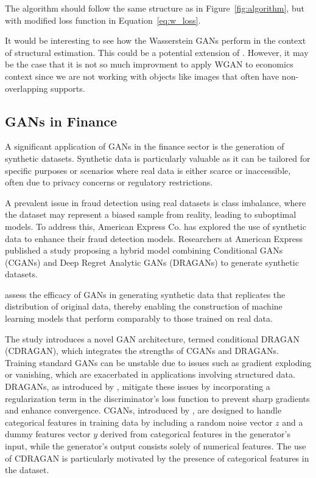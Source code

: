 \documentclass[12pt]{article}
\begin{document}
The algorithm should follow the same structure as in
Figure~\ref{fig:algorithm}, but with modified loss function in
Equation~\eqref{eq:w_loss}.

It would be interesting to see how the Wasserstein GANs perform in the context
of structural estimation. This could be a potential extension of
\citet{kaji2023adversarial}. However, it may be the case that it is not so much
improvment to apply WGAN to economics context since we are not working with
objects like images that often have non-overlapping supports.

\subsection{GANs in Finance}

A significant application of GANs in the finance sector is the generation of
synthetic datasets. Synthetic data is particularly valuable as it can be
tailored for specific purposes or scenarios where real data is either scarce or
inaccessible, often due to privacy concerns or regulatory restrictions.

A prevalent issue in fraud detection using real datasets is class imbalance,
where the dataset may represent a biased sample from reality, leading to
suboptimal models. To address this, American Express Co. has explored the use
of synthetic data to enhance their fraud detection models. Researchers at
American Express published a study \citep{efimovUsingGenerativeAdversarial2020}
proposing a hybrid model combining Conditional GANs (CGANs) and Deep Regret
Analytic GANs (DRAGANs) to generate synthetic datasets.

\cite{efimovUsingGenerativeAdversarial2020} assess the efficacy of GANs in generating synthetic data that replicates the distribution of original data, thereby enabling the construction of machine learning models that perform comparably to those trained on real data.

The study introduces a novel GAN architecture, termed conditional DRAGAN
(CDRAGAN), which integrates the strengths of CGANs and DRAGANs. Training
standard GANs can be unstable due to issues such as gradient exploding or
vanishing, which are exacerbated in applications involving structured data.
DRAGANs, as introduced by \cite{kodali2017convergence}, mitigate these issues
by incorporating a regularization term in the discriminator's loss function to
prevent sharp gradients and enhance convergence. CGANs, introduced by
\cite{mirza2014conditional}, are designed to handle categorical features in
training data by including a random noise vector \(z\) and a dummy features
vector \(y\) derived from categorical features in the generator's input, while
the generator's output consists solely of numerical features. The use of
CDRAGAN is particularly motivated by the presence of categorical features in
the dataset.
\end{document}
